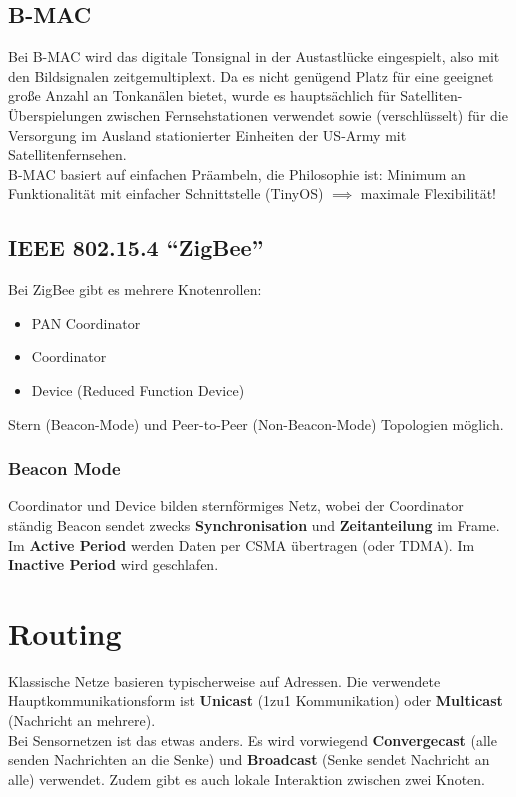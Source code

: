 \documentclass[a4paper]{article}
\begin{document}
\subsection{B-MAC}
Bei B-MAC wird das digitale Tonsignal in der Austastlücke eingespielt, also mit den Bildsignalen zeitgemultiplext. Da es nicht genügend Platz für eine geeignet große Anzahl an Tonkanälen bietet, wurde es hauptsächlich für Satelliten-Überspielungen zwischen Fernsehstationen verwendet sowie (verschlüsselt) für die Versorgung im Ausland stationierter Einheiten der US-Army mit Satellitenfernsehen. \\

B-MAC basiert auf einfachen Präambeln, die Philosophie ist: Minimum an Funktionalität mit einfacher Schnittstelle (TinyOS) $\implies$ maximale Flexibilität!

\subsection{IEEE 802.15.4 ``ZigBee''}
Bei ZigBee gibt es mehrere Knotenrollen:
\begin{itemize}
	\item PAN Coordinator
	\item Coordinator
	\item Device (Reduced Function Device)
\end{itemize}
Stern (Beacon-Mode) und Peer-to-Peer (Non-Beacon-Mode) Topologien möglich.
\subsubsection{Beacon Mode}
Coordinator und Device bilden sternförmiges Netz, wobei der Coordinator ständig Beacon sendet zwecks \textbf{Synchronisation} und \textbf{Zeitanteilung} im Frame.\\
Im \textbf{Active Period} werden Daten per CSMA übertragen (oder TDMA). Im \textbf{Inactive Period} wird geschlafen.

\newpage
\section{Routing}
Klassische Netze basieren typischerweise auf Adressen. Die verwendete Hauptkommunikationsform ist \textbf{Unicast} (1zu1 Kommunikation) oder \textbf{Multicast} (Nachricht an mehrere).\\

Bei Sensornetzen ist das etwas anders. Es wird vorwiegend \textbf{Convergecast} (alle senden Nachrichten an die Senke) und \textbf{Broadcast} (Senke sendet Nachricht an alle) verwendet.
Zudem gibt es auch lokale Interaktion zwischen zwei Knoten.\\
\end{document}
